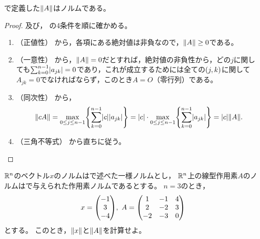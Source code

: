\documentclass[b5paper,draft,oneside,openany]{ltjsbook} %
\begin{document}
\begin{prop}
    で定義した$\norm{A}$はノルムである。
    \begin{proof}
        及び，
        の4条件を順に確かめる。
        \begin{enumerate}[label=(\roman*)]
            \item （正値性）
            から，各項にある絶対値は非負なので，$\norm{A} \geq 0$である。

            \item （一意性）
            から，$\norm{A}=0$だとすれば，絶対値の非負性から，どの$j$に関しても$\sum_{k=0}^{n-1}\abs{a_{jk}}=0$であり，これが成立するためには全ての$\pare{j,k}$に関して$A_{jk}=0$でなければならず，このとき$A=O$（零行列）である。

            \item （同次性）
            から，
            \begin{equation}
                \norm{cA}=\max_{0\leq j\leq n-1} \bra{\sum_{k=0}^{n-1} \abs{c}\abs{a_{jk}}}=\abs{c}\cdot \max_{0\leq j\leq n-1} \bra{\sum_{k=0}^{n-1} \abs{a_{jk}}}=\abs{c}\norm{A}.
            \end{equation}

            \item （三角不等式）
            から直ちに従う。
        \end{enumerate}
    \end{proof}
\end{prop}



\begin{prob}
    $\mathbb{R}^n$のベクトル$x$のノルムはで述べた一様ノルムとし，
    $\mathbb{R}^n$上の線型作用素$A$のノルムはで与えられた作用素ノルムであるとする。
    $n=3$のとき，
    \begin{equation}
        x=\vctr{-1\\3\\-4},\
        A=\pmat{1 & -1 & 4\\
            2 & -2 & 3\\
            -2 & -3 & 0
            }
    \end{equation}
    とする。
    このとき，$\norm{x}$と$\norm{A}$を計算せよ。
\end{prob}
\end{document}

